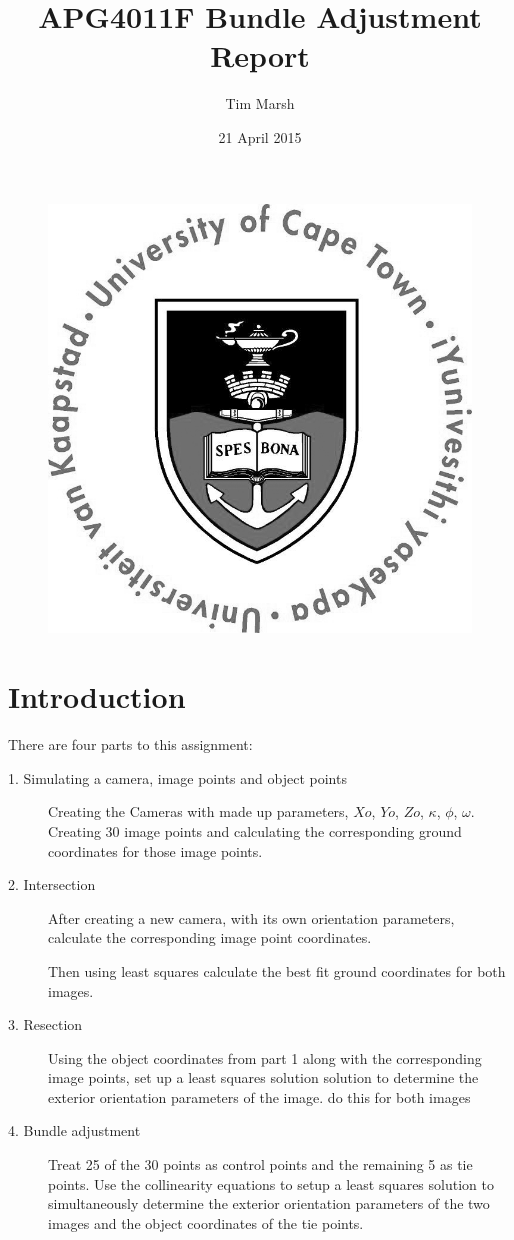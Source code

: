 \documentclass[11pt,a4paper]{article}
\title{APG4011F Bundle Adjustment Report}
\date{21 April 2015}
\author{Tim Marsh}
\begin{document}
	
	\maketitle
	\begin{figure}[H]
		\centering
		\includegraphics[width=0.7\linewidth]{images/UCTcircular_logo1_CMYK}
		\label{fig:UCTcircular_logo1_CMYK}
	\end{figure}
	\newpage
	\tableofcontents
	\listoffigures
	\newpage
	
	
	\section{Introduction}
	
	There are four parts to this assignment:
	
	\begin{description}
			\item[1. Simulating a camera, image points and object points] Creating the Cameras with made up parameters, $Xo$, $Yo$, $Zo$, $\kappa$, $\phi$, $\omega$. Creating 30 image points and calculating the corresponding ground coordinates for those image points.
			
			\item[2. Intersection] After creating a new camera, with its own orientation parameters, calculate the corresponding image point coordinates.
			
			Then using least squares calculate the best fit ground coordinates for both images.
			
			\item[3. Resection] Using the object coordinates from part 1 along with the corresponding image points, set up a least squares solution solution to determine the exterior orientation parameters of the image. do this for both images
			
			\item[4. Bundle adjustment] Treat 25 of the 30 points as control points and the remaining 5 as tie points. Use the collinearity equations to setup a least squares solution to simultaneously determine the exterior orientation parameters of the two images and the object coordinates of the tie points.
			
	\end{description}
	
\end{document}
